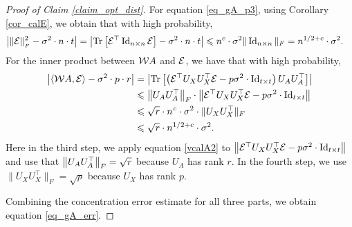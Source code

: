 \begin{proof}[Proof of Claim \ref{claim_opt_dist}]
	For equation \eqref{eq_gA_p3}, using Corollary \ref{cor_calE},
	we obtain that with high probability,
	\begin{align}
		\left\lvert\|\mathcal{E}\|_{_{F}}^2 - \sigma^2 \cdot n \cdot t\right\rvert=\left\lvert\operatorname{Tr}\left[ \mathcal E^\top \operatorname{Id}_{n\times n}\mathcal E\right] - \sigma^2 \cdot n \cdot t\right\rvert &\leqslant n^{c} \cdot \sigma^2 \| \operatorname{Id}_{n\times n}\|_F
		= n^{1/2+c} \cdot \sigma^2. \label{eq_gA_err3}
	\end{align}
	For the inner product between ${\mathcal W} A$ and $\mathcal{E}$, we have that with high probability,
	\begin{align}
		\bigabs{\inner{\cW A}{\cE} - \sigma^2\cdot p \cdot r } &= \bigabs{\bigtr{\left(\cE^\top U_X U_X^{\top}\cE  - p\sigma^2 \cdot  \id_{t\times t} \right)  U_AU_A^{\top} }} \nonumber  \\
		&\le \bignormFro{U_{A} U_A^{\top}} \cdot \bignorm{\cE^\top U_X U_X^{\top} \cE - p \sigma^2 \cdot  \id_{t\times t}} \nonumber \\
		&\le \sqrt{r} \cdot n^{\e}\cdot \sigma^2\cdot \|U_X U_X^\top\|_F \nonumber \\
		&\le \sqrt{r} \cdot n^{1/2+c} \cdot \sigma^2. \label{eq_gA_err4} %
	\end{align}
	Here in the third step, we apply equation \eqref{vcalA2} to $\left\| \mathcal{E}^\top U_X U_X^{\top} \mathcal{E} - p \sigma^2 \cdot  \operatorname{Id}_{t\times t} \right\|$ and use that $ \left\| U_{A} U_A^{\top} \right\|_{F}=\sqrt{r}$ because $U_A$ has rank $r$. In the fourth step, we use $\|U_X U_X^\top\|_F=\sqrt{p}$ because $U_X$ has rank $p$.

	Combining the concentration error estimate for all three parts, we obtain equation \eqref{eq_gA_err}.


\end{proof}
